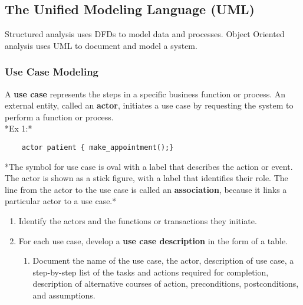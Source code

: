 \documentclass[12pt,a4paper]{article}
\begin{document}
\subsection{The Unified Modeling Language (UML)}
Structured analysis uses DFDs to model data and processes. Object Oriented analysis uses UML to document and model a system.

\subsubsection{Use Case Modeling}
A \textbf{use case} represents the steps in a specific business function or process. An external entity, called an \textbf{actor}, initiates a use case by requesting the system to perform a function or process. \\
*Ex 1:*
\begin{verbatim}
    actor patient { make_appointment();}
\end{verbatim}
*The symbol for use case is oval with a label that describes the action or event. The actor is shown as a stick figure, with a label that identifies their role. The line from the actor to the use case is called an \textbf{association}, because it links a particular actor to a use case.*

\begin{enumerate}
    \item Identify the actors and the functions or transactions they initiate.
    \item For each use case, develop a \textbf{use case description} in the form of a table.
    \begin{enumerate}
        \item Document the name of the use case, the actor, description of use case, a step-by-step list of the tasks and actions required for completion, description of alternative courses of action, preconditions, postconditions, and assumptions.
    \end{enumerate}
\end{enumerate}
\end{document}
